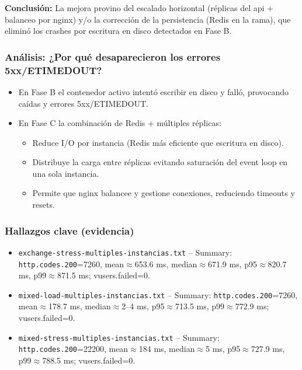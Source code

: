 \textbf{Conclusión:} La mejora provino del escalado horizontal (réplicas del api + balanceo por nginx) y/o la corrección de la persistencia (Redis en la rama), que eliminó los crashes por escritura en disco detectados en Fase B.

\subsubsection{Análisis: ¿Por qué desaparecieron los errores 5xx/ETIMEDOUT?}

\begin{itemize}[leftmargin=*]
    \item En Fase B el contenedor activo intentó escribir en disco y falló, provocando caídas y errores 5xx/ETIMEDOUT.

    \item En Fase C la combinación de Redis + múltiples réplicas:
    \begin{itemize}[leftmargin=2em]
        \item Reduce I/O por instancia (Redis más eficiente que escritura en disco).
        \item Distribuye la carga entre réplicas evitando saturación del event loop en una sola instancia.
        \item Permite que nginx balancee y gestione conexiones, reduciendo timeouts y resets.
    \end{itemize}
\end{itemize}

\subsubsection{Hallazgos clave (evidencia)}

\begin{itemize}[leftmargin=*]
    \item \texttt{exchange-stress-multiples-instancias.txt} -- Summary: \texttt{http.codes.200}=7260, mean$\approx$653.6 ms, median$\approx$671.9 ms, p95$\approx$820.7 ms, p99$\approx$871.5 ms; vusers.failed=0.

    \item \texttt{mixed-load-multiples-instancias.txt} -- Summary: \texttt{http.codes.200}=7260, mean$\approx$178.7 ms, median$\approx$2--4 ms, p95$\approx$713.5 ms, p99$\approx$772.9 ms; vusers.failed=0.

    \item \texttt{mixed-stress-multiples-instancias.txt} -- Summary: \texttt{http.codes.200}=22200, mean$\approx$184 ms, median$\approx$5 ms, p95$\approx$727.9 ms, p99$\approx$788.5 ms; vusers.failed=0.
\end{itemize}

